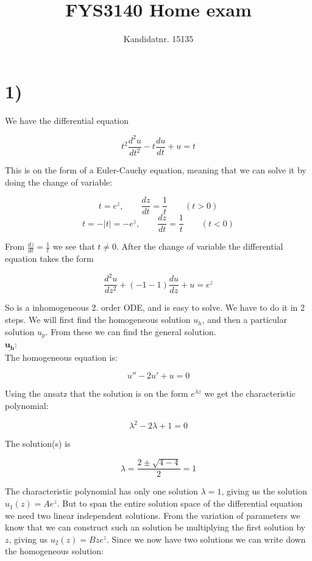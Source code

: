 \documentclass[a4paper,norsk, 10pt]{article}
\title{FYS3140 Home exam}
\author{Kandidatnr. 15135}
\begin{document}
\maketitle

\section*{1)}

We have the differential equation

\begin{equation}
t^2 \frac{d^2u}{dt^2} - t\frac{du}{dt} + u = t
\end{equation}

This is on the form of a Euler-Cauchy equation, meaning that we can solve it by doing the change of variable:

$$
t = e^z, \qquad \frac{dz}{dt} = \frac{1}{t} \qquad (t>0)
$$
$$
t = -|t| = -e^z, \qquad \frac{dz}{dt} = \frac{1}{t} \qquad (t<0)
$$

From $\frac{dz}{dt} = \frac{1}{t}$ we see that $t \neq 0$. After the change of variable the differential equation takes the form

\begin{equation}
\frac{d^2u}{dz^2} + (-1 -1)\frac{du}{dz} + u = e^z
\label{eq:transformed_DE}
\end{equation}

So is a inhomogeneous 2. order ODE, and is easy to solve. We have to do it in 2 steps. We will first find the homogeneous solution $u_h$, and then a particular solution $u_p$. From these we can find the general solution.\\

$\underline{\mathbf{u_h}}$:\\

The homogeneous equation is:

$$
u'' - 2u' + u = 0
$$

Using the ansatz that the solution is on the form $e^{\lambda z}$ we get the characteristic polynomial:

$$
\lambda^2 -2\lambda + 1 = 0
$$

The solution(s) is

$$
\lambda = \frac{2 \pm \sqrt{4-4}}{2} = 1
$$

The characteristic polynomial has only one solution $\lambda = 1$, giving us the solution $u_1(z) = Ae^z$. But to span the entire solution space of the differential equation we need two linear independent solutions. From the variation of parameters we know that we can construct such an solution be multiplying the first solution by $z$, giving us $u_2(z) = Bze^z$. Since we now have two solutions we can write down the homogeneous solution:
\end{document}
